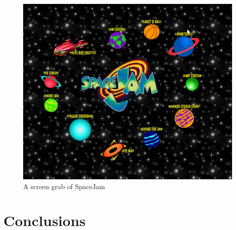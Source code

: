 \documentclass[12pt]{article}
\begin{document}
\begin{figure}[h!]
  \includegraphics[width=\textwidth]{SpaceJam.jpg}
  \caption{A screen grab of SpaceJam}
\end{figure}





\newpage
\section{Conclusions}

\end{document}

